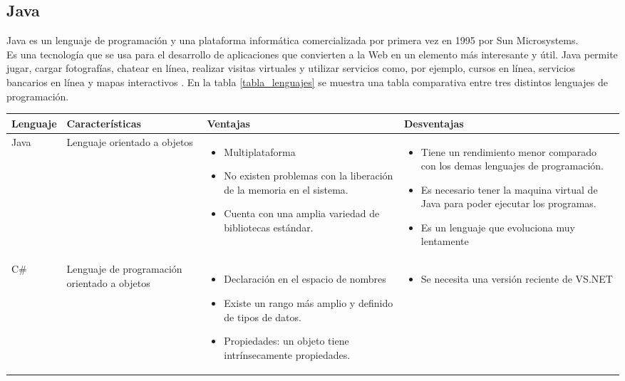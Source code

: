 \subsection{Java}
Java es un lenguaje de programación y una plataforma informática comercializada por primera vez en 1995 por Sun Microsystems.\\
Es una tecnología que se usa para el desarrollo de aplicaciones que convierten a la Web en un elemento más interesante y útil.
Java permite jugar, cargar fotografías, chatear en línea, realizar visitas virtuales y utilizar servicios como, por ejemplo, cursos en línea, servicios bancarios en línea y mapas interactivos \citep{java}.
En la tabla \ref{tabla_lenguajes} se muestra una tabla comparativa entre tres distintos lenguajes de programación.
\begin{longtable}{|M{2.5cm}|M{3cm}|M{4.2cm}|M{4.3cm}|}
		\hline 
		\textbf{Lenguaje} & \textbf{Características} & \textbf{Ventajas} & \textbf{Desventajas} \\ \hline
		Java & Lenguaje orientado a objetos & \begin{itemize}
			\item Multiplataforma
			\item No existen problemas con la liberación de la memoria en el sistema.
			\item Cuenta con una amplia variedad de bibliotecas estándar.
		\end{itemize} &  \begin{itemize}
		\item Tiene un rendimiento menor comparado con los demas lenguajes de programación.
		\item Es necesario tener la maquina virtual de Java para poder ejecutar los programas.
		\item Es un lenguaje que evoluciona muy lentamente
	\end{itemize} \\ \hline
		C\# & Lenguaje de programación orientado a objetos & \begin{itemize}
			\item Declaración en el espacio de nombres
			\item Existe un rango más amplio y definido de tipos de datos.
			\item Propiedades: un objeto tiene intrínsecamente propiedades.
		\end{itemize} & \begin{itemize}
		\item Se necesita una versión reciente de VS.NET

\end{itemize}
\end{longtable}
